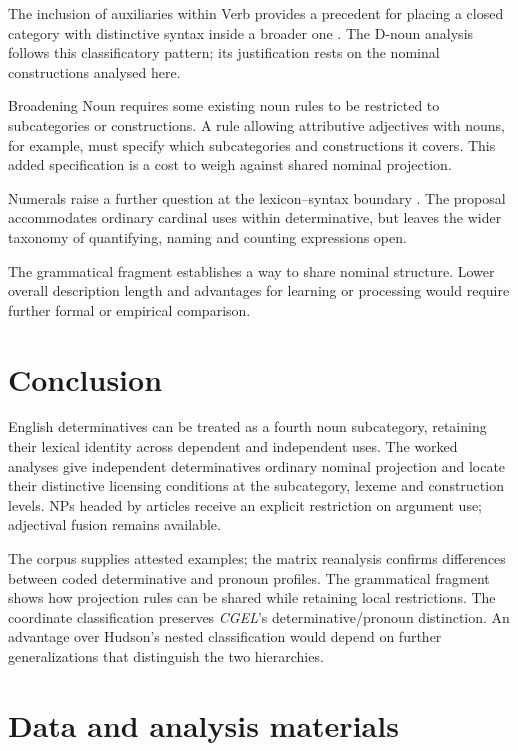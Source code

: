 \documentclass[12pt]{article}
\begin{document}
The inclusion of auxiliaries within Verb provides a precedent for placing a closed category with distinctive syntax inside a broader one \citep{pullumwilson1977}. The D-noun analysis follows this classificatory pattern; its justification rests on the nominal constructions analysed here.

Broadening Noun requires some existing noun rules to be restricted to subcategories or constructions. A rule allowing attributive adjectives with nouns, for example, must specify which subcategories and constructions it covers. This added specification is a cost to weigh against shared nominal projection.

Numerals raise a further question at the lexicon--syntax boundary \citep{reynolds2026numerals}. The proposal accommodates ordinary cardinal uses within determinative, but leaves the wider taxonomy of quantifying, naming and counting expressions open.

The grammatical fragment establishes a way to share nominal structure. Lower overall description length and advantages for learning or processing would require further formal or empirical comparison.

\section{Conclusion}\label{sec:conclusion}

English determinatives can be treated as a fourth noun subcategory, retaining their lexical identity across dependent and independent uses. The worked analyses give independent determinatives ordinary nominal projection and locate their distinctive licensing conditions at the subcategory, lexeme and construction levels. NPs headed by articles receive an explicit restriction on argument use; adjectival fusion remains available.

The corpus supplies attested examples; the matrix reanalysis confirms differences between coded determinative and pronoun profiles. The grammatical fragment shows how projection rules can be shared while retaining local restrictions. The coordinate classification preserves \textit{CGEL}'s determinative/pronoun distinction. An advantage over Hudson's nested classification would depend on further generalizations that distinguish the two hierarchies.

\section*{Data and analysis materials}
\end{document}
